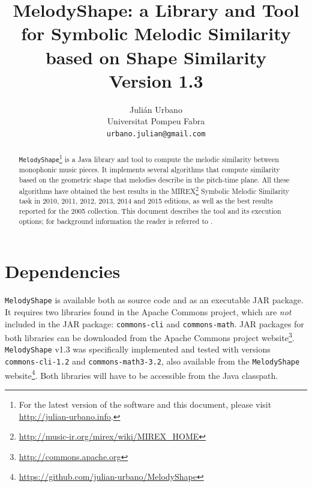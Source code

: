\documentclass[twoside]{article}
\begin{document}
\title{\textbf{MelodyShape: a Library and Tool for Symbolic Melodic Similarity based on Shape Similarity\\{\Large Version 1.3}}}
\author{Juli\'an Urbano\\Universitat Pompeu Fabra\\\texttt{urbano.julian@gmail.com}}
\maketitle

\sloppy 

\begin{abstract}
\noindent\texttt{MelodyShape}\footnote{For the latest version of the software and this document, please visit \url{http://julian-urbano.info}.} is a Java library and tool to compute the melodic similarity between monophonic music pieces. It implements several algorithms that compute similarity based on the geometric shape that melodies describe in the pitch-time plane. All these algorithms have obtained the best results in the MIREX\footnote{\url{http://music-ir.org/mirex/wiki/MIREX_HOME}} Symbolic Melodic Similarity task in 2010, 2011, 2012, 2013, 2014 and 2015 editions, as well as the best results reported for the 2005 collection. This document describes the tool and its execution options; for background information the reader is referred to \cite{Urbano2011:shape}.
\end{abstract}

\section{Dependencies}

\texttt{MelodyShape} is available both as source code and as an executable JAR package. It requires two libraries found in the Apache Commons project, which are \emph{not} included in the JAR package: \texttt{commons-cli} and \texttt{commons-math}.
JAR packages for both libraries can be downloaded from the Apache Commons project website\footnote{\url{http://commons.apache.org}}. \texttt{MelodyShape} v1.3 was specifically implemented and tested with versions \texttt{commons-cli-1.2} and \texttt{commons-math3-3.2}, also available from the \texttt{MelodyShape} website\footnote{\url{https://github.com/julian-urbano/MelodyShape}}.
Both libraries will have to be accessible from the Java classpath.
\end{document}
